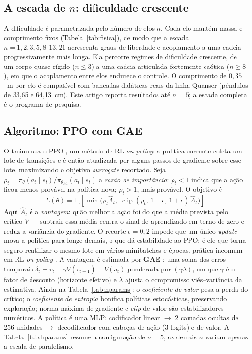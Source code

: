 \documentclass[12pt]{article}
\begin{document}
\subsection{A escada de $n$: dificuldade crescente}\label{sec:escada}

A dificuldade é parametrizada pelo número de elos $n$. Cada elo mantém massa e
comprimento fixos (Tabela~\ref{tab:fisica}), de modo que a escada
$n = 1, 2, 3, 5, 8, 13, 21$ acrescenta graus de liberdade e acoplamento a uma
cadeia progressivamente mais longa. Ela percorre regimes de dificuldade
crescente, de um corpo quase rígido ($n \leq 3$) a uma cadeia articulada
fortemente caótica ($n \geq 8$), em que o acoplamento entre elos endurece o
controle. O comprimento de $0{,}35$~m por elo é compatível com bancadas
didáticas reais da linha Quanser (pêndulos de 33,65 e 64,13~cm). Este artigo
reporta resultados até $n = 5$; a escada completa é o programa de pesquisa.

\subsection{Algoritmo: PPO com GAE}\label{sec:ppo}

O treino usa o PPO \cite{schulman2017}, um método de RL
\emph{on-policy}: a política corrente
coleta um lote de transições e é então atualizada por alguns passos de gradiente
sobre esse lote, maximizando o objetivo \emph{surrogate} recortado. Seja
$\rho_t = \pi_\theta(a_t\mid s_t)/\pi_{\theta_{\mathrm{old}}}(a_t\mid s_t)$ a
\emph{razão de importância}: $\rho_t < 1$ indica que a ação ficou menos
provável na política nova; $\rho_t > 1$, mais provável. O objetivo é
\begin{equation}
L(\theta) = \mathbb{E}_t\!\left[\min\!\big(\rho_t\hat{A}_t,\;
\operatorname{clip}(\rho_t,\,1{-}\epsilon,\,1{+}\epsilon)\,\hat{A}_t\big)\right].
\label{eq:ppo}
\end{equation}
Aqui $\hat{A}_t$ é a \emph{vantagem}: quão melhor a ação foi do que a média
prevista pelo crítico $V$ --- subtrair essa média centra o sinal de
aprendizado em torno de zero e reduz a variância do gradiente. O recorte
$\epsilon{=}0{,}2$ impede que um único \emph{update} mova a política para
longe demais, o que dá estabilidade ao PPO; é ele que torna seguro reutilizar
o mesmo lote em vários minibatches e épocas, prática incomum em RL
\emph{on-policy} \cite{barth2026}.
A vantagem é estimada por \textbf{GAE} \cite{schulman2016}: uma soma dos erros
temporais $\delta_t = r_t + \gamma V(s_{t+1}) - V(s_t)$ ponderada por
$(\gamma\lambda)$, em que $\gamma$ é o fator de desconto (horizonte efetivo) e
$\lambda$ ajusta o compromisso viés--variância da estimativa. Ainda na
Tabela~\ref{tab:hparams}: o \emph{coeficiente de valor} pesa a perda do
crítico; o \emph{coeficiente de entropia} bonifica políticas estocásticas,
preservando exploração; norma máxima de gradiente e \emph{clip} de valor são
estabilizadores numéricos. A política é uma MLP: codificador linear
$\to$ 2 camadas ocultas de 256 unidades $\to$ decodificador com cabeças de ação
(3 logits) e de valor. A Tabela~\ref{tab:hparams} resume a configuração de
$n{=}5$; os demais $n$ variam apenas a escala de paralelismo.
\end{document}
